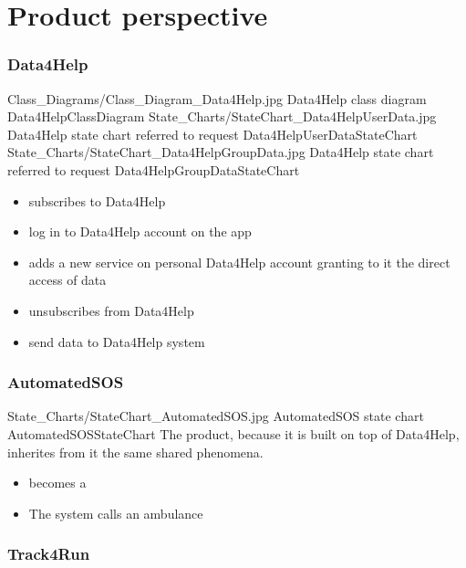 \documentclass[../../rasd.tex]{subfiles}
\begin{document}
	
	\section{Product perspective}

		\subsubsection{Data4Help}

			\image {13cm} {Class_Diagrams/Class_Diagram_Data4Help.jpg} {Data4Help class diagram} {Data4HelpClassDiagram}
			\image {13cm} {State_Charts/StateChart_Data4HelpUserData.jpg} {Data4Help state chart referred to  request} {Data4HelpUserDataStateChart}
			\image {13cm} {State_Charts/StateChart_Data4HelpGroupData.jpg} {Data4Help state chart referred to  request} {Data4HelpGroupDataStateChart}

			\begin{itemize}
				\item {} subscribes to Data4Help
				\item {} log in to Data4Help account on the app
				\item {} adds a new service on personal Data4Help account granting to it the direct access of data
				\item {} unsubscribes from Data4Help
				\item {} send data to Data4Help system
			\end{itemize}

		\subsubsection{AutomatedSOS}

			\image {13cm} {State_Charts/StateChart_AutomatedSOS.jpg} {AutomatedSOS state chart} {AutomatedSOSStateChart}
			The product, because it is built on top of Data4Help, inherites from it the same shared phenomena.

			\begin{itemize}
				\item {} becomes a 
				\item The system calls an ambulance
			\end{itemize}

		\subsubsection{Track4Run}
\end{document}
